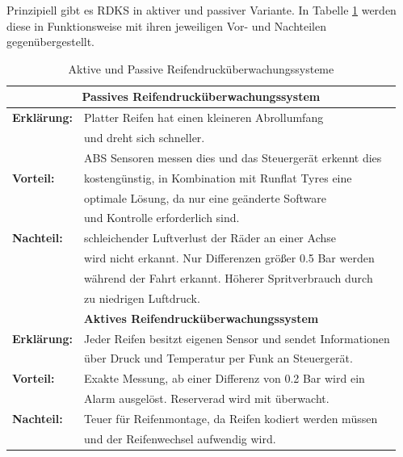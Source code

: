 	                Prinzipiell gibt es RDKS in aktiver und passiver Variante. In Tabelle \ref{fig:TS08} werden diese in Funktionsweise mit ihren jeweiligen
	                Vor- und Nachteilen gegenübergestellt.
	
	                \begin{table}
	                    \begin{tabularx}{\textwidth} {l|l}
	                        
	                        
	                        \multicolumn{2}{c}{\textbf{Passives Reifendrucküberwachungssystem}}\\
	                        \hline
	                        \textbf{Erklärung:} & Platter Reifen hat einen kleineren Abrollumfang \\ & und dreht sich schneller.\\ & ABS Sensoren messen dies und das Steuergerät erkennt dies\\
	                        \hline
	                        \textbf{Vorteil:} & kostengünstig, in Kombination mit Runflat Tyres eine \\ & optimale Lösung, da nur eine geänderte Software \\ & und Kontrolle erforderlich sind.\\
	                        \hline
	                        \textbf{Nachteil:} & schleichender Luftverlust der Räder an einer Achse \\ &  wird nicht erkannt. Nur Differenzen größer 0.5 Bar werden \\ & während der Fahrt erkannt. Höherer Spritverbrauch durch \\ & zu niedrigen Luftdruck.\\
	                        \multicolumn{2}{c}{\textbf{Aktives Reifendrucküberwachungssystem}}\\
	                        \hline
	                        \textbf{Erklärung:} & Jeder Reifen besitzt eigenen Sensor und sendet Informationen \\ & über Druck und Temperatur per Funk an Steuergerät.\\
	                        \hline
	                        \textbf{Vorteil:} & Exakte Messung, ab einer Differenz von 0.2 Bar wird ein \\ & Alarm ausgelöst. Reserverad wird mit überwacht.\\
	                        \hline
	                        \textbf{Nachteil:}  & Teuer für Reifenmontage, da Reifen kodiert werden müssen\\ & und der Reifenwechsel aufwendig wird.\\
	
	                    \end{tabularx}
	                    \caption{Aktive und Passive Reifendrucküberwachungssysteme \cite{TS_rdks}}
	                    \label{fig:TS08}
	
	                \end{table}
	
